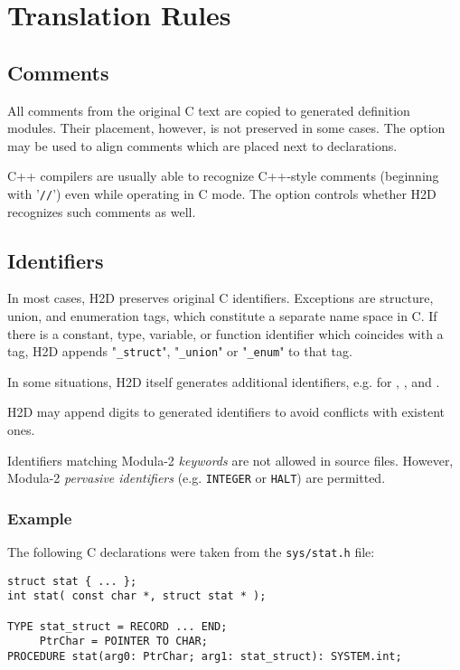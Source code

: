 \chapter{Translation Rules}
\label{rules}

\section{Comments}
\label{rules:comments}

All comments from the original C text are copied to generated definition
modules. Their placement, however, is not preserved in some cases.
The  option may be used to align comments
which are placed next to declarations.

C++ compilers are usually able to recognize C++-style comments (beginning with
'{\tt //}') even while operating in C mode. The 
option controls whether H2D recognizes such comments as well.

\section{Identifiers}
\label{rules:ids}

In most cases, H2D preserves original C identifiers. Exceptions are
structure, union, and enumeration tags, which constitute a separate name
space in C. If there is a constant, type, variable, or function identifier
which coincides with a tag, H2D appends "\verb'_struct'", "\verb'_union'"
or "\verb'_enum'" to that tag.

In some situations, H2D itself generates additional identifiers, e.g. for
,
, and
.

H2D may append digits to generated identifiers to avoid conflicts with
existent ones.

Identifiers matching Modula-2 {\em keywords} are not allowed in source files.
However, Modula-2 {\em pervasive identifiers} (e.g. \verb'INTEGER' or
\verb'HALT') are permitted.

\subsection*{Example}

{\samepage
The following C declarations were taken from the \verb'sys/stat.h' file:

{\ifonline\else\small\fi
\begin{verbatim}
struct stat { ... };
int stat( const char *, struct stat * );

TYPE stat_struct = RECORD ... END;
     PtrChar = POINTER TO CHAR;
PROCEDURE stat(arg0: PtrChar; arg1: stat_struct): SYSTEM.int;
\end{verbatim}
} %
} %

